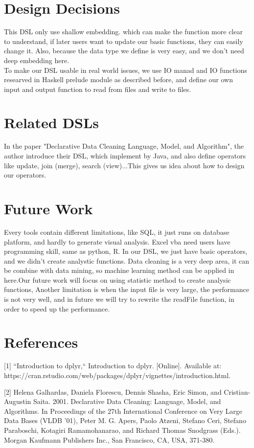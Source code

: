 \documentclass[11pt]{article}
\begin{document}
\begin{enumerate}[(1)]
\section{Design Decisions}

This DSL only use shallow embedding. which can make the function more clear to understand, if later users want to update our basic functions, they can easily change it. Also, because the data type we define is very easy, and we don't need deep embedding here. \\
To make our DSL usable in real world issues, we use IO manad and IO functions researved in Haskell prelude module as described before, and define our own input and output function to read from files and write to files.

\section{Related DSLs}
In the paper "Declarative Data Cleaning Language, Model, and Algorithm", the author introduce their DSL, which implement by Java, and also define operators like update, join (merge), search (view)...This gives us idea about how to design our operators.

\section{Future Work}


Every tools contain different limitations, like SQL, it just runs on database platform, and hardly to generate visual analysis. Excel vba need users have programming skill, same as python, R. In our DSL, we just have basic operators, and we didn’t create analystic functions. Data cleaning is a very deep area, it can be combine with data mining, so machine learning method can be applied in here.Our future work will focus on using statistic method to create analysic functions, Another limitation is when the input file is very large, the performance is not very well, and in future we will try to rewrite the readFile function, in order to speed up the performance. 





\end{enumerate}

\section*{References}


[1] ``Introduction to dplyr,`` Introduction to dplyr. [Online]. Available at: https://cran.rstudio.com/web/packages/dplyr/vignettes/introduction.html.

[2] Helena Galhardas, Daniela Florescu, Dennis Shasha, Eric Simon, and Cristian-Augustin Saita. 2001. Declarative Data Cleaning: Language, Model, and Algorithms. In Proceedings of the 27th International Conference on Very Large Data Bases (VLDB '01), Peter M. G. Apers, Paolo Atzeni, Stefano Ceri, Stefano Paraboschi, Kotagiri Ramamohanarao, and Richard Thomas Snodgrass (Eds.). Morgan Kaufmann Publishers Inc., San Francisco, CA, USA, 371-380.
\end{document}
